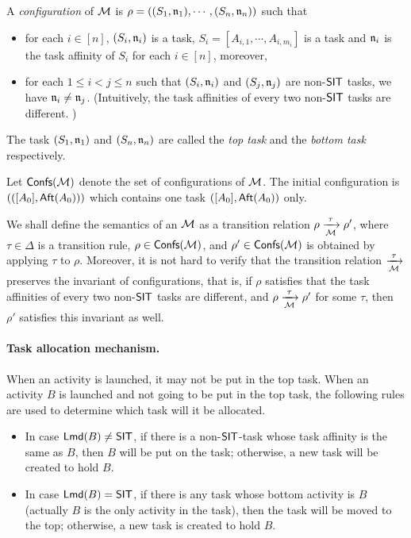 A \emph{configuration} of ${\mathcal{M} }$ is $\rho = ((S_1,\mathfrak{n}_1), \cdots, (S_n,\mathfrak{n}_n))$ such that
\begin{itemize}
\item for each $i \in [n]$, $(S_i,\mathfrak{n}_i)$ is a task, $S_i = [A_{i,1}, \cdots, A_{i, m_i}]$ is a task and $\mathfrak{n}_i$ is the task affinity of $S_i$ for each $i \in [n]$, moreover, 
%
\item for each $1 \le i < j \le n$ such that $(S_i, \mathfrak{n}_i)$ and $(S_j, \mathfrak{n}_j)$ are non-$\mathsf{SIT}$ tasks,  we have $ \mathfrak{n}_i \neq \mathfrak{n}_j$.  (Intuitively, the task affinities of every two non-$\mathsf{SIT}$ tasks are different. )
\end{itemize}
The task $(S_1,\mathfrak{n}_1)$ and $(S_n,\mathfrak{n}_n)$ are called the \emph{top task} and the \emph{bottom task} respectively. 


Let ${\mathsf{Confs} }({\mathcal{M} })$ denote the set of configurations of ${\mathcal{M} }$.
The initial configuration is $(([A_0],{\sf Aft}(A_0)))$ which contains one task $([A_0], {\sf Aft}(A_0))$ only. 

We shall define the semantics of an {\AMASS} ${\mathcal{M} }$ as a transition relation $\rho \xrightarrow[{\mathcal{M} }]{\tau} \rho'$, where $\tau \in \Delta$ is a transition rule, $\rho \in {\mathsf{Confs} }({\mathcal{M} })$, and $\rho' \in {\mathsf{Confs} }({\mathcal{M} })$ is obtained by applying $\tau$ to $\rho$. Moreover, it is not hard to verify that the transition relation $\xrightarrow[{\mathcal{M} }]{\tau}$ preserves the invariant of configurations, that is, if $\rho$ satisfies that the task affinities of every two non-${\sf SIT}$ tasks are different, and $\rho \xrightarrow[{\mathcal{M} }]{\tau} \rho'$ for some $\tau$, then $\rho'$ satisfies this invariant as well. 

\paragraph*{Task allocation mechanism.} 
When an activity is launched, it may not be put in the top task. 
When an activity $B$ is launched and not going to be put in the top task, the following rules are used to determine which task will it be allocated. 
\begin{itemize}
	\item In case ${\sf Lmd}(B) \neq \mathsf{SIT}$, if there is a non-$\mathsf{SIT}$-task whose task affinity is the same as $B$, then $B$ will be put on the task; otherwise, a new task will be created to hold $B$.
 
	\item In case ${\sf Lmd}(B) = \mathsf{SIT}$,    if there is any task whose bottom activity is $B$ (actually $B$ is the only activity in the task), then the task will be moved to the top; otherwise, a new task is created to hold $B$.
\end{itemize}



